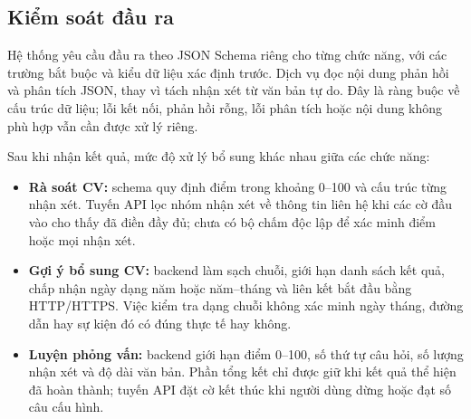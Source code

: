 \subsection{Kiểm soát đầu ra}

Hệ thống yêu cầu đầu ra theo JSON Schema riêng cho từng chức năng, với các trường bắt buộc và kiểu dữ liệu xác định trước. Dịch vụ đọc nội dung phản hồi và phân tích JSON, thay vì tách nhận xét từ văn bản tự do. Đây là ràng buộc về cấu trúc dữ liệu; lỗi kết nối, phản hồi rỗng, lỗi phân tích hoặc nội dung không phù hợp vẫn cần được xử lý riêng.

Sau khi nhận kết quả, mức độ xử lý bổ sung khác nhau giữa các chức năng:
\begin{itemize}
    \item \textbf{Rà soát CV:} schema quy định điểm trong khoảng 0--100 và cấu trúc từng nhận xét. Tuyến API lọc nhóm nhận xét về thông tin liên hệ khi các cờ đầu vào cho thấy đã điền đầy đủ; chưa có bộ chấm độc lập để xác minh điểm hoặc mọi nhận xét.
    \item \textbf{Gợi ý bổ sung CV:} backend làm sạch chuỗi, giới hạn danh sách kết quả, chấp nhận ngày dạng năm hoặc năm--tháng và liên kết bắt đầu bằng HTTP/HTTPS. Việc kiểm tra dạng chuỗi không xác minh ngày tháng, đường dẫn hay sự kiện đó có đúng thực tế hay không.
    \item \textbf{Luyện phỏng vấn:} backend giới hạn điểm 0--100, số thứ tự câu hỏi, số lượng nhận xét và độ dài văn bản. Phần tổng kết chỉ được giữ khi kết quả thể hiện đã hoàn thành; tuyến API đặt cờ kết thúc khi người dùng dừng hoặc đạt số câu cấu hình.
\end{itemize}






